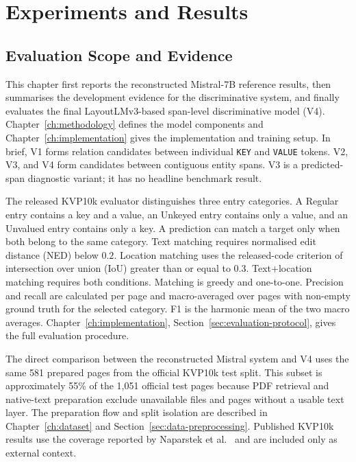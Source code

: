 \chapter{Experiments and Results}
\label{ch:exresults}



\section{Evaluation Scope and Evidence}
\label{sec:story-overview}

This chapter first reports the reconstructed Mistral-7B reference results, then
summarises the development evidence for the discriminative system, and finally
evaluates the final LayoutLMv3-based span-level discriminative model (V4).
Chapter~\ref{ch:methodology} defines the model components and
Chapter~\ref{ch:implementation} gives the implementation and training setup.
In brief, V1 forms relation candidates between individual \texttt{KEY} and
\texttt{VALUE} tokens. V2, V3, and V4 form candidates between contiguous entity
spans. V3 is a predicted-span diagnostic variant; it has no headline benchmark
result.

The released KVP10k evaluator distinguishes three entry categories. A Regular
entry contains a key and a value, an Unkeyed entry contains only a value, and an
Unvalued entry contains only a key. A prediction can match a target only when
both belong to the same category. Text matching requires normalised edit
distance (NED) below $0.2$. Location matching uses the released-code criterion
of intersection over union (IoU) greater than or equal to $0.3$. Text+location
matching requires both conditions. Matching is greedy and one-to-one.
Precision and recall are calculated per page and macro-averaged over pages with
non-empty ground truth for the selected category. F1 is the harmonic mean of
the two macro averages. Chapter~\ref{ch:implementation},
Section~\ref{sec:evaluation-protocol}, gives the full evaluation procedure.

The direct comparison between the reconstructed Mistral system and V4 uses the
same 581 prepared pages from the official KVP10k test split. This subset is
approximately 55\% of the 1{,}051 official test pages because PDF retrieval and native-text
preparation exclude unavailable files and pages without a usable text layer.
The preparation flow and split isolation are described in
Chapter~\ref{ch:dataset} and Section~\ref{sec:data-preprocessing}. Published
KVP10k results use the coverage reported by Naparstek et al.~\cite{kvp10k} and
are included only as external context.

